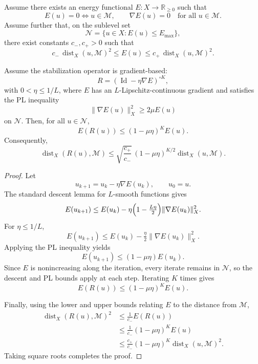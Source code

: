 \documentclass[10pt,a4paper]{amsart}
\begin{document}
\begin{lemma}
Assume there exists an energy functional
$E:X\to\mathbb{R}_{\ge 0}$ such that
\[
E(u)=0 \iff u\in\mathcal{M},
\qquad
\nabla E(u)=0
\quad \text{for all } u\in\mathcal{M}.
\]
Assume further that, on the sublevel set
\[
\mathcal{N}=\{u\in X:E(u)\le E_{\max}\},
\]
there exist constants $c_-,c_+>0$ such that
\[
c_-\,\operatorname{dist}_X(u,\mathcal{M})^2
\le E(u)
\le
c_+\,\operatorname{dist}_X(u,\mathcal{M})^2.
\]

Assume the stabilization operator is gradient-based:
\[
R=(\operatorname{Id}-\eta\nabla E)^{\circ K},
\]
with $0<\eta\le 1/L$, where $E$ has an
$L$-Lipschitz-continuous gradient and satisfies the PL inequality
\[
\|\nabla E(u)\|_X^2 \ge 2\mu E(u)
\]
on $\mathcal{N}$. Then, for all $u\in\mathcal{N}$,
\[
E(R(u))\le (1-\mu\eta)^K E(u).
\]
Consequently,
\[
\operatorname{dist}_X(R(u),\mathcal{M})
\le
\sqrt{\frac{c_+}{c_-}}\,
(1-\mu\eta)^{K/2}
\operatorname{dist}_X(u,\mathcal{M}).
\]
\end{lemma}

\begin{proof}
Let
\[
u_{k+1}=u_k-\eta\nabla E(u_k),
\qquad u_0=u.
\]
The standard descent lemma for $L$-smooth functions gives
\[
E(u_{k+1})
\le
E(u_k)
-\eta\Bigl(1-\tfrac{L\eta}{2}\Bigr)
\|\nabla E(u_k)\|_X^2.
\]
For $\eta\le 1/L$,
\[
E(u_{k+1})
\le
E(u_k)-\tfrac{\eta}{2}\|\nabla E(u_k)\|_X^2.
\]
Applying the PL inequality yields
\[
E(u_{k+1})
\le
(1-\mu\eta)E(u_k).
\]
Since $E$ is nonincreasing along the iteration, every iterate remains
in $\mathcal{N}$, so the descent and PL bounds apply at each step.
Iterating $K$ times gives
\[
E(R(u))\le (1-\mu\eta)^K E(u).
\]

Finally, using the lower and upper bounds relating $E$ to the distance
from $\mathcal{M}$,
\[
\begin{split}
\operatorname{dist}_X(R(u),\mathcal{M})^2
&\le \frac{1}{c_-}E(R(u)) \\
&\le
\frac{1}{c_-}(1-\mu\eta)^K E(u) \\
&\le
\frac{c_+}{c_-}(1-\mu\eta)^K
\operatorname{dist}_X(u,\mathcal{M})^2.
\end{split}
\]
Taking square roots completes the proof.
\end{proof}
\end{document}
